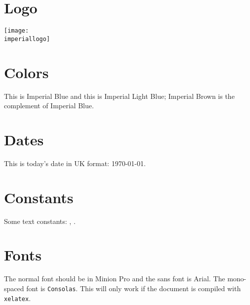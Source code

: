 \documentclass[a4paper]{article}
\begin{document}
\section*{Logo}

\texttt{[image: \\imperiallogo]}

\section*{Colors}
This is \textcolor{ImperialBlue}{Imperial Blue} and this is \textcolor{ImperialLightBlue}{Imperial Light Blue}; \textcolor{ImperialBrown}{Imperial Brown} is the complement of Imperial Blue.

\section*{Dates}
This is today's date in UK format: \today.

\section*{Constants}
Some text constants: \dept, \college.

\section*{Fonts}
The normal font should be in Minion Pro and \textsf{the sans font is Arial}.  The mono-spaced font is \texttt{Consolas}.  This will only work if the document is compiled with \texttt{xelatex}.
\end{document}

